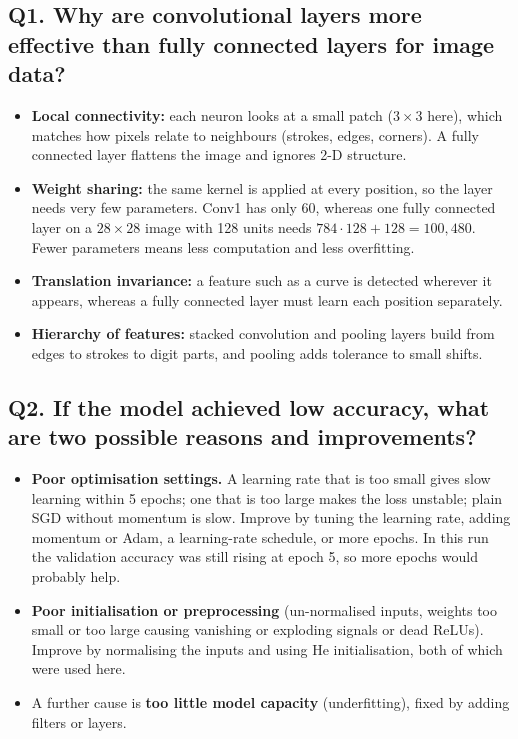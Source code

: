 \documentclass[11pt,a4paper]{article}
\begin{document}
\subsection*{Q1. Why are convolutional layers more effective than fully connected layers for image data?}
\begin{itemize}
  \item \textbf{Local connectivity:} each neuron looks at a small patch ($3{\times}3$ here), which matches how pixels relate to neighbours (strokes, edges, corners). A fully connected layer flattens the image and ignores 2-D structure.
  \item \textbf{Weight sharing:} the same kernel is applied at every position, so the layer needs very few parameters. Conv1 has only 60, whereas one fully connected layer on a $28{\times}28$ image with 128 units needs $784\cdot128+128=100{,}480$. Fewer parameters means less computation and less overfitting.
  \item \textbf{Translation invariance:} a feature such as a curve is detected wherever it appears, whereas a fully connected layer must learn each position separately.
  \item \textbf{Hierarchy of features:} stacked convolution and pooling layers build from edges to strokes to digit parts, and pooling adds tolerance to small shifts.
\end{itemize}

\subsection*{Q2. If the model achieved low accuracy, what are two possible reasons and improvements?}
\begin{itemize}
  \item \textbf{Poor optimisation settings.} A learning rate that is too small gives slow learning within 5 epochs; one that is too large makes the loss unstable; plain SGD without momentum is slow. Improve by tuning the learning rate, adding momentum or Adam, a learning-rate schedule, or more epochs. In this run the validation accuracy was still rising at epoch 5, so more epochs would probably help.
  \item \textbf{Poor initialisation or preprocessing} (un-normalised inputs, weights too small or too large causing vanishing or exploding signals or dead ReLUs). Improve by normalising the inputs and using He initialisation, both of which were used here.
  \item A further cause is \textbf{too little model capacity} (underfitting), fixed by adding filters or layers.
\end{itemize}
\end{document}
